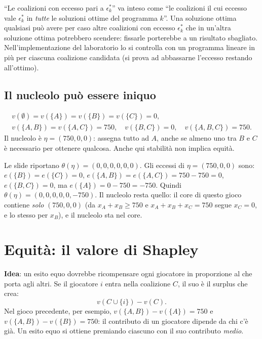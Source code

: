 \begin{attenzione}
``Le coalizioni con eccesso pari a $\epsilon_k^*$'' va inteso come ``le coalizioni il cui
eccesso vale $\epsilon_k^*$ in \emph{tutte} le soluzioni ottime del programma $k$''. Una
soluzione ottima qualsiasi può avere per caso altre coalizioni con eccesso
$\epsilon_k^*$ che in un'altra soluzione ottima potrebbero scendere: fissarle porterebbe a un
risultato sbagliato. Nell'implementazione del laboratorio lo si controlla con un programma
lineare in più per ciascuna coalizione candidata (si prova ad abbassarne l'eccesso restando
all'ottimo).
\end{attenzione}

\subsection{Il nucleolo può essere iniquo}

\begin{esempio}
\begin{gather*}
  v(\emptyset) = v(\{A\}) = v(\{B\}) = v(\{C\}) = 0,\\
  v(\{A,B\}) = v(\{A,C\}) = 750,\quad v(\{B,C\}) = 0,\quad v(\{A,B,C\}) = 750.
\end{gather*}
Il nucleolo è $\eta = (750, 0, 0)$: assegna tutto ad $A$, anche se almeno uno tra $B$ e $C$
è necessario per ottenere qualcosa. Anche qui stabilità non implica equità.
\end{esempio}

\begin{attenzione}
Le slide riportano $\theta(\eta) = (0,0,0,0,0,0)$. Gli eccessi di $\eta = (750,0,0)$ sono:
$e(\{B\}) = e(\{C\}) = 0$, $e(\{A,B\}) = e(\{A,C\}) = 750 - 750 = 0$, $e(\{B,C\}) = 0$, ma
$e(\{A\}) = 0 - 750 = -750$. Quindi $\theta(\eta) = (0,0,0,0,0,-750)$. Il nucleolo resta
quello: il core di questo gioco contiene \emph{solo} $(750,0,0)$ (da $x_A + x_B \ge 750$ e
$x_A + x_B + x_C = 750$ segue $x_C = 0$, e lo stesso per $x_B$), e il nucleolo sta nel core.
\end{attenzione}

\section{Equità: il valore di Shapley}

\textbf{Idea}: un esito equo dovrebbe ricompensare ogni giocatore in proporzione al
 che porta agli altri. Se il giocatore $i$ entra nella coalizione $C$, il suo
 è il surplus che crea:
\[
  v(C \cup \{i\}) - v(C).
\]
Nel gioco precedente, per esempio, $v(\{A,B\}) - v(\{A\}) = 750$ e
$v(\{A,B\}) - v(\{B\}) = 750$: il contributo di un giocatore dipende da chi c'è già. Un
esito equo si ottiene premiando ciascuno con il suo contributo \emph{medio}.


